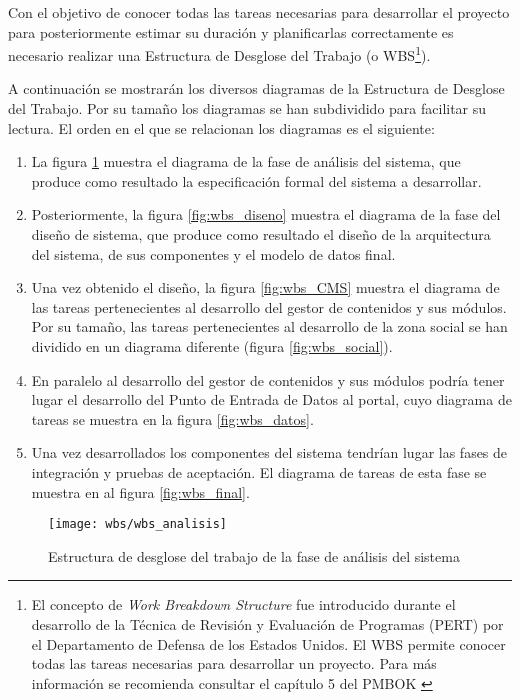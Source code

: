 Con el objetivo de conocer todas las tareas necesarias para desarrollar el proyecto para posteriormente estimar su duración y planificarlas correctamente es necesario realizar una Estructura de Desglose del Trabajo (o WBS\footnote{El concepto de \textit{Work Breakdown Structure} fue introducido durante el desarrollo de la Técnica de Revisión y Evaluación de Programas (PERT) por el Departamento de Defensa de los Estados Unidos.  El WBS permite conocer todas las tareas necesarias para desarrollar un proyecto.  Para más información se recomienda consultar el capítulo 5 del PMBOK \cite{pmi:pmbok}}).

A continuación se mostrarán los diversos diagramas de la Estructura de Desglose del Trabajo.  Por su tamaño los diagramas se han subdividido para facilitar su lectura.  El orden en el que se relacionan los diagramas es el siguiente:
\begin{enumerate}
	\item
		La figura \ref{fig:wbs_analisis} muestra el diagrama de la fase de análisis del sistema, que produce como resultado la especificación formal del sistema a desarrollar.
	\item
		Posteriormente, la figura \ref{fig:wbs_diseno} muestra el diagrama de la fase del diseño de sistema, que produce como resultado el diseño de la arquitectura del sistema, de sus componentes y el modelo de datos final.
	\item
		Una vez obtenido el diseño, la figura \ref{fig:wbs_CMS} muestra el diagrama de las tareas pertenecientes al desarrollo del gestor de contenidos y sus módulos.  Por su tamaño, las tareas pertenecientes al desarrollo de la zona social se han dividido en un diagrama diferente (figura \ref{fig:wbs_social}).
	\item
		En paralelo al desarrollo del gestor de contenidos y sus módulos podría tener lugar el desarrollo del Punto de Entrada de Datos al portal, cuyo diagrama de tareas se muestra en la figura \ref{fig:wbs_datos}.
	\item
		Una vez desarrollados los componentes del sistema tendrían lugar las fases de integración y pruebas de aceptación.  El diagrama de tareas de esta fase se muestra en al figura \ref{fig:wbs_final}.
\end{enumerate}

\begin{figure}[h]
	\centering
	\texttt{[image: wbs/wbs\_analisis]}
	\caption{Estructura de desglose del trabajo de la fase de análisis del sistema}
	\label{fig:wbs_analisis}
\end{figure}

